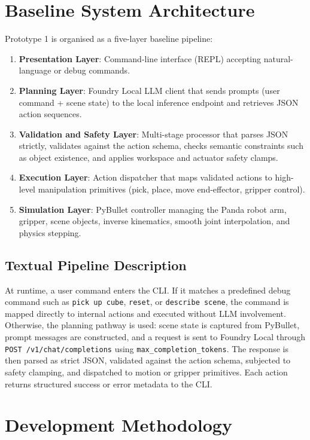 \documentclass[12pt,a4paper]{article}
\begin{document}
\section{Baseline System Architecture}

Prototype 1 is organised as a five-layer baseline pipeline:

\begin{enumerate}
\item \textbf{Presentation Layer}: Command-line interface (REPL) accepting natural-language or debug commands.
\item \textbf{Planning Layer}: Foundry Local LLM client that sends prompts (user command + scene state) to the local inference endpoint and retrieves JSON action sequences.
\item \textbf{Validation and Safety Layer}: Multi-stage processor that parses JSON strictly, validates against the action schema, checks semantic constraints such as object existence, and applies workspace and actuator safety clamps.
\item \textbf{Execution Layer}: Action dispatcher that maps validated actions to high-level manipulation primitives (pick, place, move end-effector, gripper control).
\item \textbf{Simulation Layer}: PyBullet controller managing the Panda robot arm, gripper, scene objects, inverse kinematics, smooth joint interpolation, and physics stepping.
\end{enumerate}

\subsection*{Textual Pipeline Description}
At runtime, a user command enters the CLI. If it matches a predefined debug command such as \texttt{pick up cube}, \texttt{reset}, or \texttt{describe scene}, the command is mapped directly to internal actions and executed without LLM involvement. Otherwise, the planning pathway is used: scene state is captured from PyBullet, prompt messages are constructed, and a request is sent to Foundry Local through \texttt{POST /v1/chat/completions} using \texttt{max\_completion\_tokens}. The response is then parsed as strict JSON, validated against the action schema, subjected to safety clamping, and dispatched to motion or gripper primitives. Each action returns structured success or error metadata to the CLI.

\section{Development Methodology}
\end{document}
